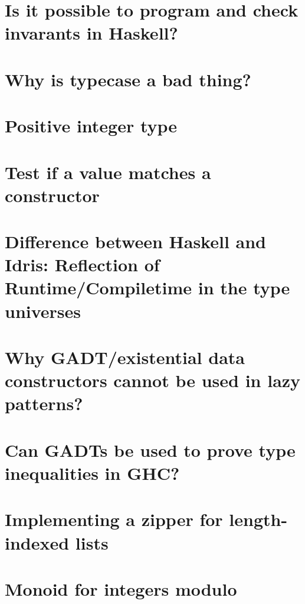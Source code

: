 \documentclass{book}
\begin{document}
\section{Is it possible to program and check invarants in Haskell?}


\section{Why is typecase a bad thing?}


\section{Positive integer type}


\section{Test if a value matches a constructor}


\section{Difference between Haskell and Idris: Reflection of Runtime/Compiletime in the type universes}


\section{Why GADT/existential data constructors cannot be used in lazy patterns?}


\section{Can GADTs be used to prove type inequalities in GHC?}


\section{Implementing a zipper for length-indexed lists}


\section{Monoid for integers modulo}

\end{document}
